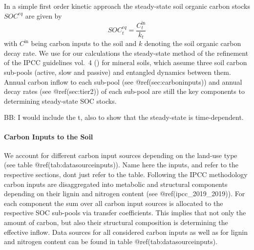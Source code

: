 \documentclass[gc, manuscript]{copernicus}
\begin{document}
In a simple first order kinetic approach the steady-state soil organic
carbon stocks \(SOC^{eq}\) are given by \begin{equation}
SOC^{eq}_t =\frac{C^{\textrm{in}}_t}{k_t}
\label{eq:inoutflow}
\end{equation} with \(C^{\textrm{in}}\) being carbon inputs to the soil
and \(k\) denoting the soil organic carbon decay rate. We use for our
calculations the steady-state method of the refinement of the IPCC
guidelines vol.~4 (\citet{ipcc_2019_2019}) for mineral soils, which
assume three soil carbon sub-pools (active, slow and passive) and
entangled dynamics between them. Annual carbon inflow to each sub-pool
(see @ref(sec:carboninputs)) and annual decay rates (see
@ref(sec:tier2)) of each sub-pool are still the key components to
determining steady-state SOC stocks.

BB: I would include the t, also to show that the steady-state is
time-dependent.

\hypertarget{sec:carboninputs}{%
\paragraph{Carbon Inputs to the Soil}\label{sec:carboninputs}}

We account for different carbon input sources depending on the land-use
type (see table @ref(tab:datasourceinputs)). Name here the inputs, and
refer to the respective sections, dont just refer to the table.
Following the IPCC methodology carbon inputs are disaggregated into
metabolic and structural components depending on their lignin and
nitrogen content (see @ref(ipcc\_2019\_2019)). For each component the
sum over all carbon input sources is allocated to the respective SOC
sub-pools via transfer coefficients. This implies that not only the
amount of carbon, but also their structural composition is determining
the effective inflow. Data sources for all considered carbon inputs as
well as for lignin and nitrogen content can be found in table
@ref(tab:datasourceinputs).
\end{document}
